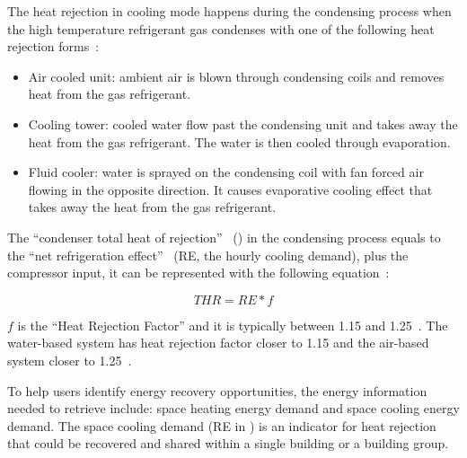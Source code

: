 The heat rejection in cooling mode happens during the condensing
process when the high temperature refrigerant gas condenses with one
of the following heat rejection forms~\cite{Bhatia2015}:
\begin{itemize}
\item Air cooled unit: ambient air is blown through condensing coils
  and removes heat from the gas refrigerant.
\item Cooling tower: cooled water flow past the condensing unit and
  takes away the heat from the gas refrigerant. The water is then
  cooled through evaporation.
\item Fluid cooler: water is sprayed on the condensing coil with fan
  forced air flowing in the opposite direction. It causes evaporative
  cooling effect that takes away the heat from the gas refrigerant.
\end{itemize}
The ``condenser total heat of rejection''~\cite{Bhatia2015} () in
the condensing process equals to the ``net refrigeration effect''
~\cite{Bhatia2015}(RE, the hourly cooling demand), plus the compressor
input, it can be represented with the following equation~\cite{Bhatia2015}:

\begin{equation}\label{eq:reject}
\mathit{THR} = RE * f 
\end{equation}

$f$ is the ``Heat Rejection Factor'' and it is typically between 1.15
and 1.25~\cite{Bhatia2015}. The water-based system has heat rejection
factor closer to 1.15 and the air-based system closer to
1.25~\cite{Bhatia2015}.

To help users identify energy recovery opportunities, the energy
information needed to retrieve include: space heating energy demand
and space cooling energy demand. The space cooling demand (RE in
) is an indicator for heat rejection that could be
recovered and shared within a single building or a building group.

